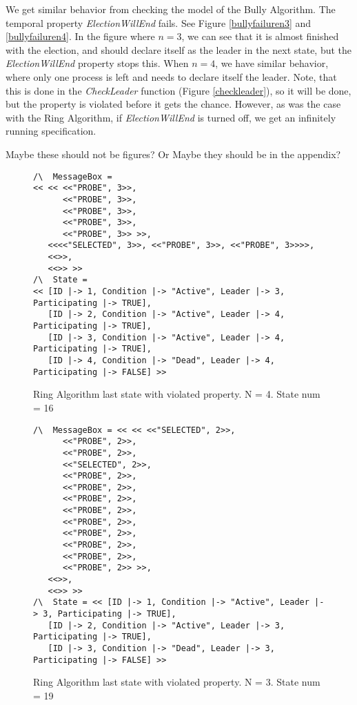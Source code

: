 \documentclass{report}
\begin{document}
We get similar behavior from checking the model of the Bully Algorithm. The temporal property \textit{ElectionWillEnd} fails. See Figure \ref{bullyfailuren3} and \ref{bullyfailuren4}. In the figure where $n = 3$, we can see that it is almost finished with the election, and should declare itself as the leader in the next state, but the \textit{ElectionWillEnd} property stops this. When $n=4$, we have similar behavior, where only one process is left and needs to declare itself the leader. Note, that this is done in the \textit{CheckLeader} function (Figure \ref{checkleader}), so it will be done, but the property is violated before it gets the chance. However, as was the case with the Ring Algorithm, if \textit{ElectionWillEnd} is turned off, we get an infinitely running specification.

\begin{callout}
  Maybe these should not be figures? Or Maybe they should be in the appendix?
  \end{callout}

\begin{figure}
  \begin{lstlisting}
/\  MessageBox =
<< << <<"PROBE", 3>>,
      <<"PROBE", 3>>,
      <<"PROBE", 3>>,
      <<"PROBE", 3>>,
      <<"PROBE", 3>> >>,
   <<<<"SELECTED", 3>>, <<"PROBE", 3>>, <<"PROBE", 3>>>>,
   <<>>,
   <<>> >>
/\  State =
<< [ID |-> 1, Condition |-> "Active", Leader |-> 3, Participating |-> TRUE],
   [ID |-> 2, Condition |-> "Active", Leader |-> 4, Participating |-> TRUE],
   [ID |-> 3, Condition |-> "Active", Leader |-> 4, Participating |-> TRUE],
   [ID |-> 4, Condition |-> "Dead", Leader |-> 4, Participating |-> FALSE] >>

  \end{lstlisting}

  \caption{Ring Algorithm last state with violated property. N = 4. State num = 16}
  \label{ringfailuren4}
\end{figure}

\begin{figure}
\begin{lstlisting}
/\  MessageBox = << << <<"SELECTED", 2>>,
      <<"PROBE", 2>>,
      <<"PROBE", 2>>,
      <<"SELECTED", 2>>,
      <<"PROBE", 2>>,
      <<"PROBE", 2>>,
      <<"PROBE", 2>>,
      <<"PROBE", 2>>,
      <<"PROBE", 2>>,
      <<"PROBE", 2>>,
      <<"PROBE", 2>>,
      <<"PROBE", 2>>,
      <<"PROBE", 2>> >>,
   <<>>,
   <<>> >>
/\  State = << [ID |-> 1, Condition |-> "Active", Leader |-> 3, Participating |-> TRUE],
   [ID |-> 2, Condition |-> "Active", Leader |-> 3, Participating |-> TRUE],
   [ID |-> 3, Condition |-> "Dead", Leader |-> 3, Participating |-> FALSE] >>

\end{lstlisting}

  \caption{Ring Algorithm last state with violated property. N = 3. State num = 19}
  \label{ringfailuren3}
\end{figure}
\end{document}
